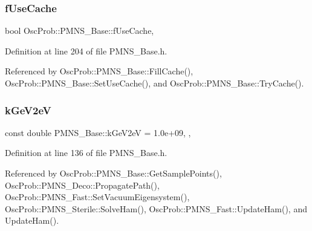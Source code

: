 \mbox{\label{classOscProb_1_1PMNS__Base_ad28c12ef897b5555eda509ea55c99107}} 
\subsubsection{\texorpdfstring{f\+Use\+Cache}{fUseCache}}
{\footnotesize\ttfamily bool Osc\+Prob\+::\+P\+M\+N\+S\+\_\+\+Base\+::f\+Use\+Cache\hspace{0.3cm}{\ttfamily [protected]}, {\ttfamily [inherited]}}



Definition at line 204 of file P\+M\+N\+S\+\_\+\+Base.\+h.



Referenced by Osc\+Prob\+::\+P\+M\+N\+S\+\_\+\+Base\+::\+Fill\+Cache(), Osc\+Prob\+::\+P\+M\+N\+S\+\_\+\+Base\+::\+Set\+Use\+Cache(), and Osc\+Prob\+::\+P\+M\+N\+S\+\_\+\+Base\+::\+Try\+Cache().

\mbox{\label{classOscProb_1_1PMNS__Base_ad36a0a6bf58d6ec093d3947784bd89e9}} 
\subsubsection{\texorpdfstring{k\+Ge\+V2eV}{kGeV2eV}}
{\footnotesize\ttfamily const double P\+M\+N\+S\+\_\+\+Base\+::k\+Ge\+V2eV = 1.\+0e+09\hspace{0.3cm}{\ttfamily [static]}, {\ttfamily [protected]}, {\ttfamily [inherited]}}



Definition at line 136 of file P\+M\+N\+S\+\_\+\+Base.\+h.



Referenced by Osc\+Prob\+::\+P\+M\+N\+S\+\_\+\+Base\+::\+Get\+Sample\+Points(), Osc\+Prob\+::\+P\+M\+N\+S\+\_\+\+Deco\+::\+Propagate\+Path(), Osc\+Prob\+::\+P\+M\+N\+S\+\_\+\+Fast\+::\+Set\+Vacuum\+Eigensystem(), Osc\+Prob\+::\+P\+M\+N\+S\+\_\+\+Sterile\+::\+Solve\+Ham(), Osc\+Prob\+::\+P\+M\+N\+S\+\_\+\+Fast\+::\+Update\+Ham(), and Update\+Ham().


